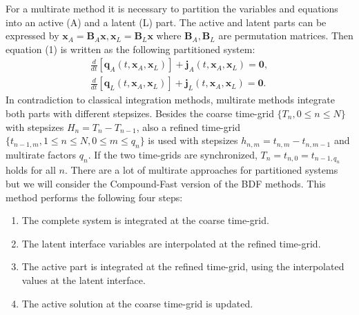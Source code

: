 \documentclass[twosided]{report}
\begin{document}
For a multirate method it
is necessary to partition the variables and equations into
an active (A) and a latent (L) part. The active and latent
parts can be expressed by $\mathbf{x}_A = \mathbf{B}_A
\mathbf{x},\mathbf{x}_L = \mathbf{B}_L \mathbf{x}$ where
$\mathbf{B}_A,\mathbf{B}_L$ are permutation matrices. Then
equation (1) is written as the following
partitioned system:
$$
\begin{array}{c} \frac{d}{dt}\left
[\mathbf{q}_{A}(t,\mathbf{x}_A,\mathbf{x}_L)\right
]+\mathbf{j}_{A}(t,\mathbf{x}_A,\mathbf{x}_L)=\mathbf{0},\\
\frac{d}{dt}\left
[\mathbf{q}_{L}(t,\mathbf{x}_A,\mathbf{x}_L)\right
]+\mathbf{j}_{L}(t,\mathbf{x}_A,\mathbf{x}_L)=\mathbf{0}.
\end{array}
$$
In contradiction to classical
integration methods, multirate methods integrate both parts
with different stepsizes. Besides the coarse time-grid
$\{T_n,0\leq n \leq N\}$ with stepsizes $H_n = T_n -
T_{n-1}$, also a refined time-grid $\{t_{n-1,m},1\leq n \leq
N, 0 \leq m \leq q_n\}$ is used with stepsizes $h_{n,m} =
t_{n,m} - t_{n,m-1}$ and multirate factors $q_n$. If the two
time-grids are synchronized, $T_n= t_{n,0} = t_{n-1,q_n}$
holds for all $n$. There are a lot of multirate approaches
for partitioned systems but we will consider the
Compound-Fast version of the BDF methods. This method
performs the following four steps:
\begin{enumerate}
\item
The complete system is integrated at the coarse time-grid.
\item The latent interface variables are interpolated at the
refined time-grid. \item The active part is integrated at
the refined time-grid, using the interpolated values at the
latent interface. \item The active solution at the coarse
time-grid is updated.
\end{enumerate}
\end{document}
